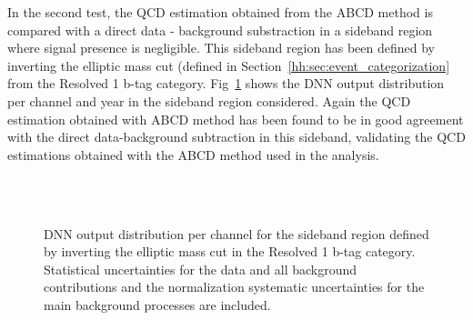 \documentclass[../main.tex]{subfiles}
\begin{document}
In the second test, the QCD estimation obtained from the ABCD method is compared with a direct data - background substraction in a sideband region where signal presence is negligible. This sideband region has been defined by inverting the elliptic mass cut (defined in Section~\ref{hh:sec:event_categorization} from the Resolved 1 b-tag category. Fig~\ref{hh:fig:qcd_test2_dnn} shows the DNN output distribution per channel and year in the sideband region considered. Again the QCD estimation obtained with ABCD method has been found to be in good agreement with the direct data-background subtraction in this sideband, validating the QCD estimations obtained with the ABCD method used in the analysis.

\begin{figure}
\centering
{}
\\
\\
    \caption{DNN output distribution per channel for the sideband region defined by inverting the elliptic mass cut in the Resolved 1 b-tag category.  Statistical uncertainties for the data and all background contributions and the normalization systematic uncertainties for the main background processes are included.}
    \label{hh:fig:qcd_test2_dnn}
\end{figure}
\end{document}
